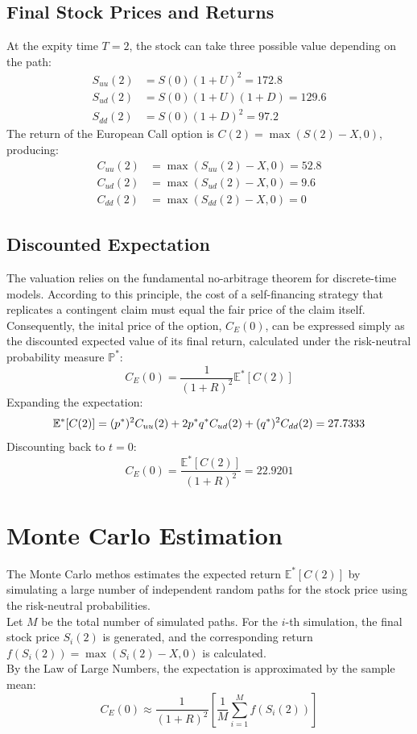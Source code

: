 \documentclass[12pt, a4paper]{article}
\begin{document}
\subsection{Final Stock Prices and Returns}
At the expity time $T = 2$, the stock can take three possible value depending on the path:
\begin{align*}
    S_{uu}(2) &= S(0)(1+U)^2 = 172.8 \\
    S_{ud}(2) &= S(0)(1+U)(1+D) = 129.6 \\
    S_{dd}(2) &= S(0)(1+D)^2 = 97.2
\end{align*}
The return of the European Call option is $C(2) = \max(S(2) - X, 0)$, producing:
\begin{align*}
    C_{uu}(2) &= \max(S_{uu}(2) - X, 0) =  52.8 \\
    C_{ud}(2) &= \max(S_{ud}(2) - X, 0) = 9.6 \\
    C_{dd}(2) &= \max(S_{dd}(2) - X, 0) = 0
\end{align*}

\subsection{Discounted Expectation}
The valuation relies on the fundamental no-arbitrage theorem for discrete-time models. According to this principle, the cost of a self-financing strategy that replicates a contingent claim must equal the fair price of the claim itself. Consequently, the inital price of the option, $C_E(0)$, can be expressed simply as the discounted expected value of its final return, calculated under the risk-neutral probability measure $\mathbb{P}^*$:
\begin{equation}
    C_E(0) = \frac{1}{(1+R)^2} \mathbb{E}^*[C(2)]
\end{equation}
Expanding the expectation:
\begin{equation}
    \mathbb{E}^*[C(2)] = (p^*)^2 C_{uu}(2) + 2p^*q^* C_{ud}(2) + (q^*)^2 C_{dd}(2) = 27.7333 \\
\end{equation}
Discounting back to $t = 0$:
\begin{equation}
    C_E(0) = \frac{\mathbb{E}^*[C(2)]}{(1+R)^2} = 22.9201
\end{equation}

\section{Monte Carlo Estimation}
The Monte Carlo methos estimates the expected return $\mathbb{E}^*[C(2)]$ by simulating a large number of independent random paths for the stock price using the risk-neutral probabilities.\\
Let $M$ be the total number of simulated paths. For the $i$-th simulation, the final stock price $S_i(2)$ is generated, and the corresponding return $f(S_i(2)) = \max(S_i(2) - X, 0)$ is calculated.\\
By the Law of Large Numbers, the expectation is approximated by the sample mean:
\begin{equation}
    C_E(0) \approx \frac{1}{(1+R)^2} \left[ \frac{1}{M} \sum_{i=1}^{M} f(S_i(2)) \right]
\end{equation}
\end{document}
